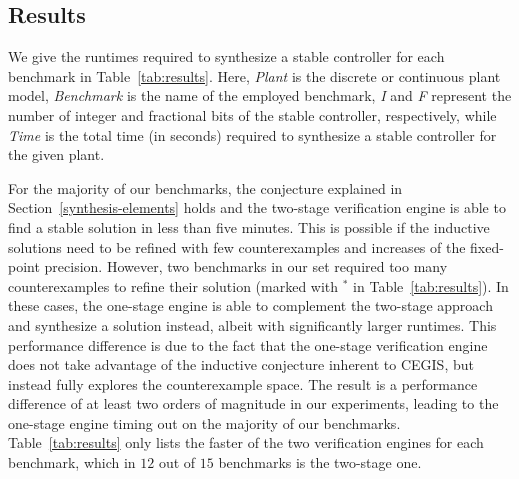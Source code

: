 \documentclass[final]{sig-alternate-05-2015}
\begin{document}
\subsection{Results}
\label{experimental-results}

We give the runtimes required to synthesize a stable controller for each
benchmark in Table~\ref{tab:results}.  Here, \textit{Plant} is the discrete
or continuous plant model, \textit{Benchmark} is the name of the employed
benchmark, \textit{I} and \textit{F} represent the number of integer and
fractional bits of the stable controller, respectively, while \textit{Time}
is the total time (in seconds) required to synthesize a stable controller
for the given plant.

For the majority of our benchmarks, the conjecture explained in
Section~\ref{synthesis-elements} holds and the two-stage verification 
engine %
is able to find a stable solution in less than five minutes.  This is possible if the
inductive solutions need to be refined with few counterexamples and
increases of the fixed-point precision.  However, two benchmarks in our set
required too many counterexamples to refine their solution (marked with $^*$
in Table~\ref{tab:results}).  In these cases, the one-stage engine 
is able to complement the two-stage approach and synthesize a solution
instead, albeit with significantly larger runtimes.  This performance
difference is due to the fact that the one-stage verification engine does
not take advantage of the inductive conjecture inherent to CEGIS, but
instead fully explores the counterexample space.  The result is a
performance difference of at least two orders of magnitude in our
experiments, leading to the one-stage engine timing out on the majority of
our benchmarks.  Table~\ref{tab:results} only lists the faster of the two
verification engines for each benchmark, which in $12$ out of $15$
benchmarks is the two-stage one.
\end{document}
